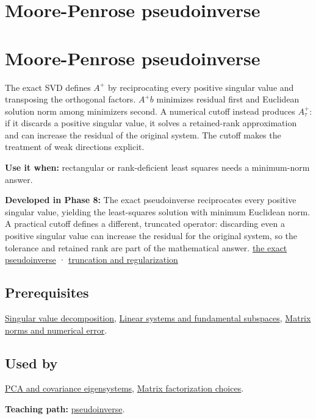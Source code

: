 \hypertarget{appendix-541306fdbc1b}{}
\section*{Moore-Penrose pseudoinverse}
\section{Moore-Penrose pseudoinverse}\label{appendix-541306fdbc1b-moore-penrose-pseudoinverse}

The exact SVD defines \(A^+\) by reciprocating every positive singular value and transposing the orthogonal factors. \(A^+b\) minimizes residual first and Euclidean solution norm among minimizers second. A numerical cutoff instead produces \(A_\tau^+\): if it discards a positive singular value, it solves a retained-rank approximation and can increase the residual of the original system. The cutoff makes the treatment of weak directions explicit.

\textbf{Use it when:} rectangular or rank-deficient least squares needs a minimum-norm answer.

\textbf{Developed in Phase 8:} The exact pseudoinverse reciprocates every positive singular value, yielding the least-squares solution with minimum Euclidean norm. A practical cutoff defines a different, truncated operator: discarding even a positive singular value can increase the residual for the original system, so the tolerance and retained rank are part of the mathematical answer. \hyperref[02-foundations-ii-ch024-the-moorepenrose-inverse-and-its-four-identities]{the exact pseudoinverse} · \hyperref[02-foundations-ii-ch024-thresholding-and-regularization-are-different-choices]{truncation and regularization}

\subsection{Prerequisites}\label{appendix-541306fdbc1b-prerequisites}

\hyperref[appendix-1fad5e7f36fa]{Singular value decomposition}, \hyperref[appendix-8572a4a060c1]{Linear systems and fundamental subspaces}, \hyperref[appendix-f8657bac66e5]{Matrix norms and numerical error}.

\subsection{Used by}\label{appendix-541306fdbc1b-used-by}

\hyperref[appendix-ad175ef3c5bf]{PCA and covariance eigensystems}, \hyperref[appendix-221a483bec2d]{Matrix factorization choices}.

\textbf{Teaching path:} \hyperref[02-foundations-ii-ch024-pseudoinverse-makes-least-squares-and-minimum-norm-one-operation]{pseudoinverse}.
